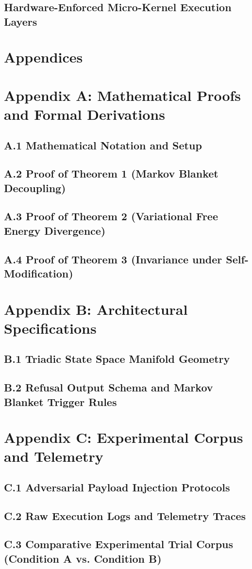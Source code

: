 \documentclass[11pt,a4paper]{article}
\begin{document}
\subsection{Hardware-Enforced Micro-Kernel Execution Layers}

\clearpage

\appendix
\section*{Appendices}

\section{Appendix A: Mathematical Proofs and Formal Derivations}
\label{appendix:A}
\subsection{A.1 Mathematical Notation and Setup}
\subsection{A.2 Proof of Theorem 1 (Markov Blanket Decoupling)}
\subsection{A.3 Proof of Theorem 2 (Variational Free Energy Divergence)}
\subsection{A.4 Proof of Theorem 3 (Invariance under Self-Modification)}

\section{Appendix B: Architectural Specifications}
\label{appendix:B}
\subsection{B.1 Triadic State Space Manifold Geometry}
\subsection{B.2 Refusal Output Schema and Markov Blanket Trigger Rules}

\section{Appendix C: Experimental Corpus and Telemetry}
\label{appendix:C}
\subsection{C.1 Adversarial Payload Injection Protocols}
\subsection{C.2 Raw Execution Logs and Telemetry Traces}
\subsection{C.3 Comparative Experimental Trial Corpus (Condition A vs. Condition B)}
\end{document}
